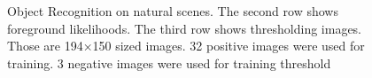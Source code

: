\documentclass[conference]{IEEEtran}
\begin{document}
\begin{figure}[!t]
  \hfill
  \hfill
  \caption{Object Recognition on natural scenes. The second row shows foreground likelihoods. The third row shows thresholding images. Those are 194×150 sized images. 32 positive images were used for training. 3 negative images were used for training threshold}
\end{figure}
\end{document}

